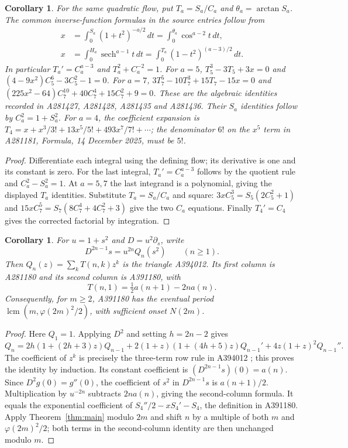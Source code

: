 \documentclass[11pt]{article}
\newtheorem{corollary}[theorem]{Corollary}
\newcommand{\ph}{\varphi}
\begin{document}
\begin{corollary}\label{cor:inverse}
For the same quadratic flow, put $T_a=S_a/C_a$ and
$\theta_a=\arctan S_a$. The common inverse-function formulas in
the source entries follow from
\[
 \begin{aligned}
 x&=\int_0^{S_a}(1+t^2)^{-a/2}\,dt
   =\int_0^{\theta_a}\cos^{a-2}t\,dt,\\
 x&=\int_0^{H_a}\operatorname{sech}^{a-1}t\,dt
   =\int_0^{T_a}(1-t^2)^{(a-3)/2}\,dt.
 \end{aligned}
\]
In particular $T_a'=C_a^{a-3}$ and $T_a^2+C_a^{-2}=1$.
For $a=5$, $T_5^3-3T_5+3x=0$ and
$(4-9x^2)C_5^6-3C_5^2-1=0$.
For $a=7$, $3T_7^5-10T_7^3+15T_7-15x=0$ and
$(225x^2-64)C_7^{10}+40C_7^4+15C_7^2+9=0$.
These are the algebraic identities recorded in A281427, A281428,
A281435 and A281436. Their $S_a$ identities follow by
$C_a^2=1+S_a^2$.
For $a=4$, the coefficient expansion is
$T_4=x+x^3/3!+13x^5/5!+493x^7/7!+\cdots$;
the denominator $6!$ on the $x^5$ term in A281181, Formula,
14 December 2025, must be $5!$.
\end{corollary}
\begin{proof}
Differentiate each integral using the defining flow; its derivative is
one and its constant is zero. For the last integral,
$T_a'=C_a^{a-3}$ follows by the quotient rule and $C_a^2-S_a^2=1$.
At $a=5,7$ the last integrand is a polynomial, giving the displayed
$T_a$ identities. Substitute $T_a=S_a/C_a$ and square:
$3xC_5^3=S_5(2C_5^2+1)$ and
$15xC_7^5=S_7(8C_7^4+4C_7^2+3)$ give the two $C_a$ equations.
Finally $T_4'=C_4$ gives the corrected factorial by integration.
\end{proof}

\begin{corollary}\label{cor:triangle}
For $u=1+s^2$ and $D=u^2\partial_s$, write
\[
 D^{2n-1}s=u^{2n}Q_n(s^2)\qquad(n\ge1).
\]
Then $Q_n(z)=\sum_k T(n,k)z^k$ is the triangle A394012.
Its first column is A281180 and its second column is A391180, with
\[
 T(n,1)=\tfrac12 a(n+1)-2n a(n).
\]
Consequently, for $m\ge2$, A391180 has the eventual period
$\operatorname{lcm}(m,\ph(2m)^2/2)$, with sufficient onset $N(2m)$.
\end{corollary}
\begin{proof}
Here $Q_1=1$. Applying $D^2$ and setting $h=2n-2$ gives
\[
 Q_n=2h(1+(2h+3)z)Q_{n-1}
 +2(1+z)(1+(4h+5)z)Q_{n-1}'
 +4z(1+z)^2Q_{n-1}''.
\]
The coefficient of $z^k$ is precisely the three-term row rule
in A394012 \cite{oeistriangle}; this proves the identity by induction.
Its constant coefficient is $(D^{2n-1}s)(0)=a(n)$.
Since $D^2g(0)=g''(0)$, the coefficient of $s^2$ in
$D^{2n-1}s$ is $a(n+1)/2$. Multiplication by $u^{-2n}$
subtracts $2n a(n)$, giving the second-column formula.
It equals the exponential coefficient of
$S_4''/2-xS_4'-S_4$, the definition in A391180.
Apply Theorem~\ref{thm:main} modulo $2m$ and shift $n$ by a
multiple of both $m$ and $\ph(2m)^2/2$; both terms in the
second-column identity are then unchanged modulo $m$.
\end{proof}
\end{document}
